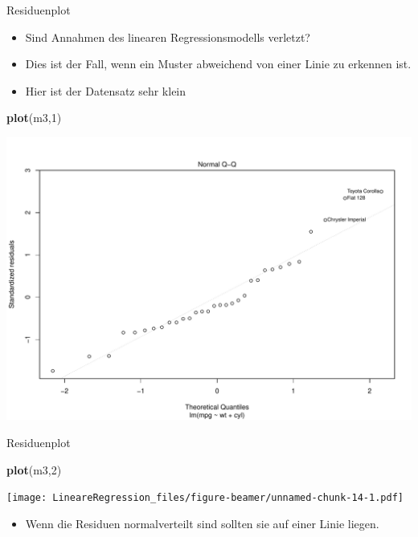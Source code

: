 \documentclass[
  ignorenonframetext,
]{beamer}
\newenvironment{Shaded}{\begin{snugshade}}{\end{snugshade}}
\newcommand{\DecValTok}[1]{\textcolor[rgb]{0.27,0.67,0.26}{#1}}
\newcommand{\KeywordTok}[1]{\textcolor[rgb]{0.26,0.66,0.93}{\textbf{#1}}}
\newcommand{\NormalTok}[1]{\textcolor[rgb]{0.74,0.68,0.62}{#1}}
\providecommand{\tightlist}{%
  \setlength{\itemsep}{0pt}\setlength{\parskip}{0pt}}
\begin{document}
\begin{frame}[fragile]{Residuenplot}
\protect\hypertarget{residuenplot}{}

\begin{itemize}
\tightlist
\item
  Sind Annahmen des linearen Regressionsmodells verletzt?
\item
  Dies ist der Fall, wenn ein Muster abweichend von einer Linie zu
  erkennen ist.
\item
  Hier ist der Datensatz sehr klein
\end{itemize}

\begin{Shaded}
\begin{Highlighting}[]
\KeywordTok{plot}\NormalTok{(m3,}\DecValTok{1}\NormalTok{)}
\end{Highlighting}
\end{Shaded}

\includegraphics{LineareRegression_files/figure-beamer/unnamed-chunk-13-1.pdf}

\end{frame}

\begin{frame}[fragile]{Residuenplot}
\protect\hypertarget{residuenplot-1}{}

\begin{Shaded}
\begin{Highlighting}[]
\KeywordTok{plot}\NormalTok{(m3,}\DecValTok{2}\NormalTok{)}
\end{Highlighting}
\end{Shaded}

\texttt{[image: LineareRegression\_files/figure-beamer/unnamed-chunk-14-1.pdf]}

\begin{itemize}
\tightlist
\item
  Wenn die Residuen normalverteilt sind sollten sie auf einer Linie
  liegen.
\end{itemize}

\end{frame}
\end{document}
